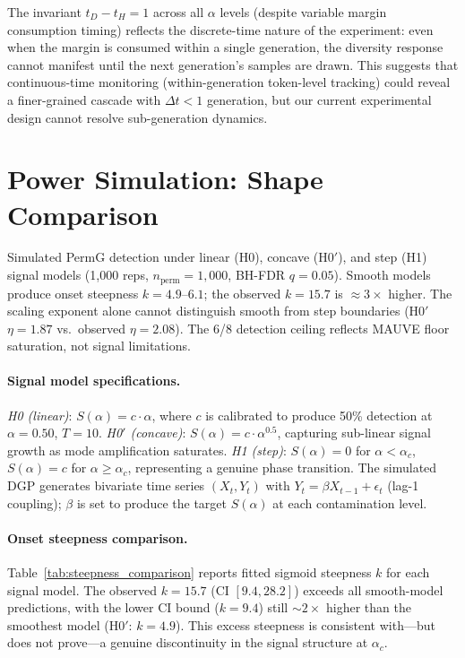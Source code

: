 The invariant $t_D - t_H = 1$ across all $\alpha$ levels (despite variable margin consumption timing) reflects the discrete-time nature of the experiment: even when the margin is consumed within a single generation, the diversity response cannot manifest until the next generation's samples are drawn.
This suggests that continuous-time monitoring (within-generation token-level tracking) could reveal a finer-grained cascade with $\Delta t < 1$ generation, but our current experimental design cannot resolve sub-generation dynamics.

\section{Power Simulation: Shape Comparison}
\label{app:power_sim}

Simulated PermG detection under linear (H0), concave (H0$'$), and step (H1) signal models (1{,}000 reps, $n_\text{perm}{=}1{,}000$, BH-FDR $q{=}0.05$).
Smooth models produce onset steepness $k{=}4.9$--$6.1$; the observed $k{=}15.7$ is ${\approx}3{\times}$ higher.
The scaling exponent alone cannot distinguish smooth from step boundaries (H0$'$ $\eta{=}1.87$ vs.\ observed $\eta{=}2.08$).
The 6/8 detection ceiling reflects MAUVE floor saturation, not signal limitations.

\paragraph{Signal model specifications.}
\emph{H0 (linear)}: $S(\alpha) = c \cdot \alpha$, where $c$ is calibrated to produce 50\% detection at $\alpha{=}0.50$, $T{=}10$.
\emph{H0$'$ (concave)}: $S(\alpha) = c \cdot \alpha^{0.5}$, capturing sub-linear signal growth as mode amplification saturates.
\emph{H1 (step)}: $S(\alpha) = 0$ for $\alpha < \alpha_c$, $S(\alpha) = c$ for $\alpha \geq \alpha_c$, representing a genuine phase transition.
The simulated DGP generates bivariate time series $(X_t, Y_t)$ with $Y_t = \beta X_{t-1} + \epsilon_t$ (lag-1 coupling); $\beta$ is set to produce the target $S(\alpha)$ at each contamination level.

\paragraph{Onset steepness comparison.}
Table~\ref{tab:steepness_comparison} reports fitted sigmoid steepness $k$ for each signal model.
The observed $k{=}15.7$ (CI $[9.4, 28.2]$) exceeds all smooth-model predictions, with the lower CI bound ($k{=}9.4$) still ${\sim}2{\times}$ higher than the smoothest model (H0$'$: $k{=}4.9$).
This excess steepness is consistent with---but does not prove---a genuine discontinuity in the signal structure at $\alpha_c$.

